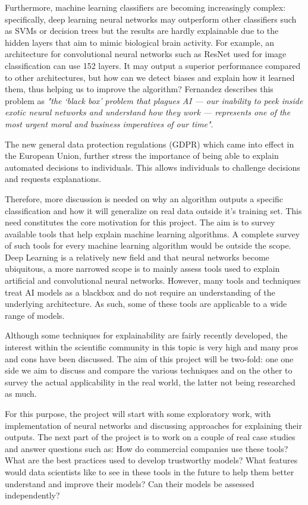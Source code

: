 \documentclass[proposal]{softeng}
\begin{document}
Furthermore, machine learning classifiers are becoming increasingly complex: specifically, deep learning neural networks may outperform other classifiers such as SVMs or decision trees but the results are hardly explainable due to the hidden layers that aim to mimic biological brain activity. For example, an architecture for convolutional neural networks such as ResNet\cite{res-net} used for image classification can use 152 layers. It may output a superior performance compared to other architectures, but how can we detect biases and explain how it learned them, thus helping us to improve the algorithm?  Fernandez\cite{fernandez-dark-ai} describes this problem as \textit{"the ‘black box’ problem that plagues AI — our inability to peek inside exotic neural networks and understand how they work — represents one of the most urgent moral and business imperatives of our time"}.

The new general data protection regulations (GDPR) which came into effect in the European Union, further stress the importance of being able to explain automated decisions to individuals. This allows individuals to challenge decisions \cite{GoodmanB2017EUro, gdpr} and requests explanations.

Therefore, more discussion is needed on why an algorithm outputs a specific classification and how it will generalize on real data outside it's training set. This need constitutes the core motivation for this project. The aim is to survey available tools that help explain machine learning algorithms. A complete survey of such tools for every machine learning algorithm would be outside the scope. Deep Learning is a relatively new field and that neural networks become ubiquitous, a more narrowed scope is to mainly assess tools used to explain artificial and convolutional neural networks. However, many tools and techniques treat AI models as a blackbox and do not require an understanding of the underlying architecture. As such, some of these tools are applicable to a wide range of models.

Although some techniques for explainability are fairly recently developed, the interest within the scientific community in this topic is very high and many pros and cons have been discussed. The aim of this project will be two-fold: one one side we aim to discuss and compare the various techniques and on the other to survey the actual applicability in the real world, the latter not being researched as much. 

For this purpose, the project will start with some exploratory work, with implementation of neural networks and discussing approaches for explaining their outputs. The next part of the project is to work on a couple of real case studies and answer questions such as: How do commercial companies use these tools? What are the best practices used to develop trustworthy models? What features would data scientists like to see in these tools in the future to help them better understand and improve their models? Can their models be assessed independently?
\end{document}
